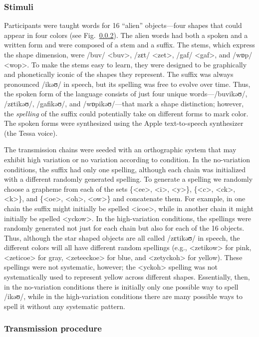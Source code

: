 \documentclass[doc,biblatex]{apa7}
\begin{document}
\subsubsection{Stimuli}

Participants were taught words for 16 ``alien'' objects---four shapes that could appear in four colors (see Fig.~\ref{}). The alien words had both a spoken and a written form and were composed of a stem and a suffix. The stems, which express the shape dimension, were /buv/ <buv>, /zɛt/ <zet>, /gaf/ <gaf>, and /wɒp/ <wop>. To make the stems easy to learn, they were designed to be graphically and phonetically iconic of the shapes they represent. The suffix was always pronounced /ikəʊ/ in speech, but its spelling was free to evolve over time. Thus, the spoken form of the language consists of just four unique words---/buvikəʊ/, /zɛtikəʊ/, /gafikəʊ/, and /wɒpikəʊ/---that mark a shape distinction; however, the \textit{spelling} of the suffix could potentially take on different forms to mark color. The spoken forms were synthesized using the Apple text-to-speech synthesizer (the Tessa voice).

The transmission chains were seeded with an orthographic system that may exhibit high variation or no variation according to condition. In the no-variation conditions, the suffix had only one spelling, although each chain was initialized with a different randomly generated spelling. To generate a spelling we randomly choose a grapheme from each of the sets \{<ee>, <i>, <y>\}, \{<c>, <ck>, <k>\}, and \{<oe>, <oh>, <ow>\} and concatenate them. For example, in one chain the suffix might initially be spelled <icoe>, while in another chain it might initially be spelled <yckow>. In the high-variation conditions, the spellings were randomly generated not just for each chain but also for each of the 16 objects. Thus, although the star shaped objects are all called /zɛtikəʊ/ in speech, the different colors will all have different random spellings (e.g., <zetikow> for pink, <zeticoe> for gray, <zeteeckoe> for blue, and <zetyckoh> for yellow). These spellings were not systematic, however; the <yckoh> spelling was not systematically used to represent yellow across different shapes. Essentially, then, in the no-variation conditions there is initially only one possible way to spell /ikəʊ/, while in the high-variation conditions there are many possible ways to spell it without any systematic pattern.

\subsubsection{Transmission procedure}
\end{document}
